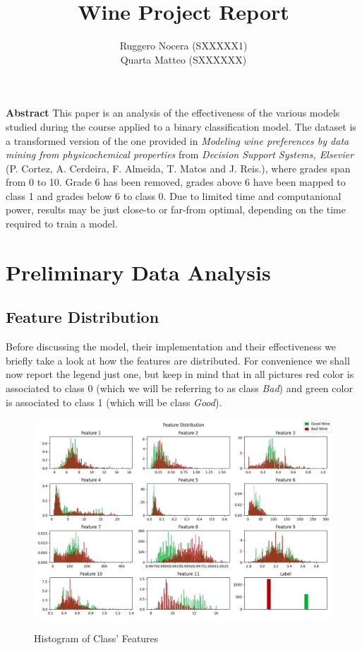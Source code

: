 \documentclass[12pt, twocolumn]{article}
\title{Wine Project Report}
\author{Ruggero Nocera (SXXXXX1) \\ Quarta Matteo (SXXXXXX)}
\date{}
\begin{document}
\maketitle
\begin{strip}
    {\bf Abstract}
    This paper is an analysis of the effectiveness of the various models studied during the course applied to a binary classification model.
    The dataset is a transformed version of the one provided in {\it Modeling wine preferences by data mining from physicochemical properties}
    from {\it Decision Support Systems, Elsevier} (P. Cortez, A. Cerdeira, F. Almeida, T. Matos and J. Reis.), where grades span from 0 to 10. 
    Grade 6 has been removed, grades above 6 have been mapped to class 1 and grades below 6 to class 0.
    Due to limited time and computanional power, results may be just close-to or far-from optimal, depending on the time required to train a model.
\end{strip}
\tableofcontents


\section{Preliminary Data Analysis}
\subsection{Feature Distribution}

Before discussing the model, their implementation and their effectiveness we briefly take a look at how the features are distributed.
For convenience we shall now report the legend just one, but keep in mind that in all pictures red color is associated to class 0 (which we will be referring to as class {\it Bad}) and green color is associated to class 1 (which will be class {\it Good}).

\begin{figure}[H] 
    \caption{Histogram of Class' Features}
    \label{fig:disthist}
    {\includegraphics[width=\linewidth]{dist.jpg}}
\end{figure}
\end{document}
